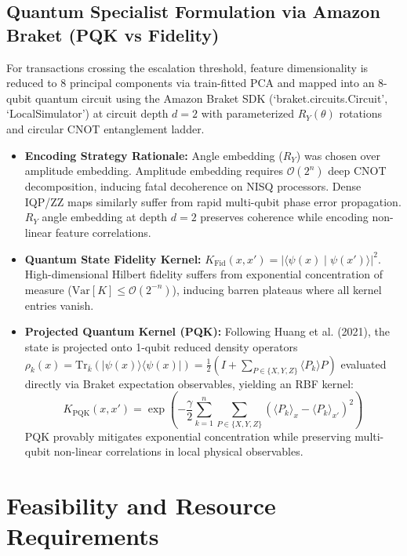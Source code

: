 \documentclass[10pt,a4paper]{article}
\begin{document}
\subsection{Quantum Specialist Formulation via Amazon Braket (PQK vs Fidelity)}
For transactions crossing the escalation threshold, feature dimensionality is reduced to 8 principal components via train-fitted PCA and mapped into an 8-qubit quantum circuit using the Amazon Braket SDK (`braket.circuits.Circuit', `LocalSimulator') at circuit depth $d=2$ with parameterized $R_Y(\theta)$ rotations and circular CNOT entanglement ladder.
\begin{itemize}[leftmargin=*,itemsep=0.2pt,topsep=1pt]
\item \textbf{Encoding Strategy Rationale:} Angle embedding ($R_Y$) was chosen over amplitude embedding. Amplitude embedding requires $\mathcal{O}(2^n)$ deep CNOT decomposition, inducing fatal decoherence on NISQ processors. Dense IQP/ZZ maps similarly suffer from rapid multi-qubit phase error propagation. $R_Y$ angle embedding at depth $d=2$ preserves coherence while encoding non-linear feature correlations.
\item \textbf{Quantum State Fidelity Kernel:} $K_{\text{Fid}}(x, x') = |\langle \psi(x) \mid \psi(x') \rangle|^2$. High-dimensional Hilbert fidelity suffers from exponential concentration of measure ($\mathrm{Var}[K] \le \mathcal{O}(2^{-n})$), inducing barren plateaus where all kernel entries vanish.
\item \textbf{Projected Quantum Kernel (PQK):} Following Huang et al. (2021), the state is projected onto 1-qubit reduced density operators $\rho_k(x) = \text{Tr}_{\bar{k}}(|\psi(x)\rangle\langle\psi(x)|) = \frac{1}{2}(I + \sum_{P \in \{X,Y,Z\}} \langle P_k \rangle P)$ evaluated directly via Braket expectation observables, yielding an RBF kernel:
\begin{equation}
K_{\text{PQK}}(x, x') = \exp\left(-\frac{\gamma}{2}\sum_{k=1}^n \sum_{P \in \{X,Y,Z\}} (\langle P_k \rangle_x - \langle P_k \rangle_{x'})^2\right)
\end{equation}
PQK provably mitigates exponential concentration while preserving multi-qubit non-linear correlations in local physical observables.
\end{itemize}

\section{Feasibility and Resource Requirements}
\end{document}
